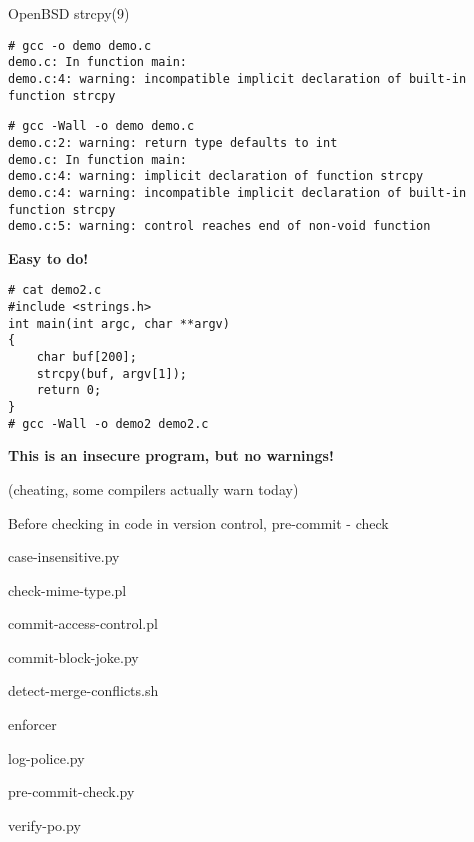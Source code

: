 \documentclass[Screen16to9,17pt]{foils}
\begin{document}
OpenBSD strcpy(9)


\begin{verbatim}
# gcc -o demo demo.c
demo.c: In function main:
demo.c:4: warning: incompatible implicit declaration of built-in
function strcpy
\end{verbatim}

\begin{verbatim}
# gcc -Wall -o demo demo.c
demo.c:2: warning: return type defaults to int
demo.c: In function main:
demo.c:4: warning: implicit declaration of function strcpy
demo.c:4: warning: incompatible implicit declaration of built-in
function strcpy
demo.c:5: warning: control reaches end of non-void function
\end{verbatim}

\vskip 15mm
\centerline{\bf\LARGE\color{security6blue}Easy to do!}


\begin{verbatim}
# cat demo2.c
#include <strings.h>
int main(int argc, char **argv)
{
    char buf[200];
    strcpy(buf, argv[1]);
    return 0;
}
# gcc -Wall -o demo2 demo2.c
\end{verbatim}

\vskip 1cm
\centerline{\bf\large\color{security6blue}This is an insecure program, but no warnings!}

(cheating, some compilers actually warn today)


\begin{list1}
\item Before checking in code in version control,  pre-commit - check
\begin{list2}
\item case-insensitive.py
\item check-mime-type.pl
\item commit-access-control.pl
\item commit-block-joke.py
\item detect-merge-conflicts.sh
\item enforcer
\item log-police.py
\item pre-commit-check.py
\item verify-po.py
\end{list2}
\item {}
\item {}
\end{list1}
\end{document}
